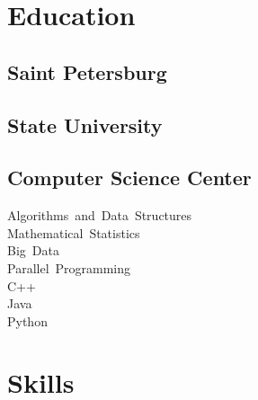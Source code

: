 \documentclass[letterpaper]{deedy-resume} %
\begin{document}
\begin{minipage}[t][0.75\textheight][t]{0.33\textwidth} %


\section{Education} 
\sectionspace

\subsection{Saint Petersburg}   %
\subsection{State University}
\sectionspace
{}%


\sectionspace %

\subsection{Computer Science Center}
\sectionspace

Algorithms~and~Data~Structures \\ %
Mathematical~Statistics \\ %
Big~Data \\ %
Parallel~Programming \\ %
C++ \\ %
Java \\ %
Python


\sectionspace %


\section{Skills}
\sectionspace


\end{minipage}
\end{document}
